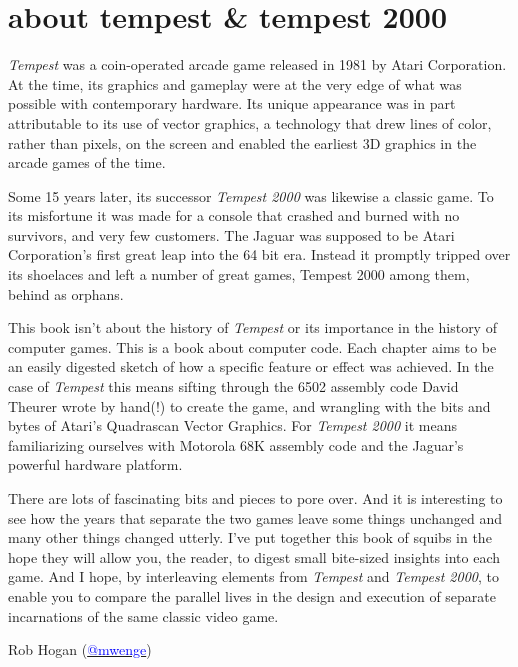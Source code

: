 \chapter*{about tempest \& tempest 2000} 
\textit{Tempest} was a coin-operated arcade game released in 1981 by Atari
Corporation. At the time, its graphics and gameplay were at the very edge of
what was possible with contemporary hardware.  Its unique appearance was in
part attributable to its use of vector graphics, a technology that
drew lines of color, rather than pixels, on the screen and enabled the earliest
3D graphics in the arcade games of the time.

Some 15 years later, its successor \textit{Tempest 2000} was likewise a classic
game. To its misfortune it was made for a console that crashed and burned with
no survivors, and very few customers. The Jaguar was supposed to be Atari Corporation's first great
leap into the 64 bit era. Instead it promptly tripped over its shoelaces and
left a number of great games, Tempest 2000 among them, behind as orphans.

This book isn't about the history of \textit{Tempest} or its importance in the history
of computer games.  This is a book about computer code. Each chapter aims to be
an easily digested sketch of how a specific feature or effect was achieved. In
the case of \textit{Tempest} this means sifting through the 6502 assembly code
David Theurer wrote by hand(!) to create the game, and wrangling with the bits
and bytes of Atari's Quadrascan Vector Graphics. For \textit{Tempest 2000} it
means familiarizing ourselves with Motorola 68K assembly code and the Jaguar's
powerful hardware platform.

There are lots of fascinating bits and pieces to pore over. And it is
interesting to see how the years that separate the two games leave some things
unchanged and many other things changed utterly. I've put together this book of
squibs in the hope they will allow you, the reader, to digest small bite-sized
insights into each game. And I hope, by interleaving elements from \textit{Tempest} and
\textit{Tempest 2000}, to enable you to compare the parallel lives in the design
and execution of separate incarnations of the same classic video game.

Rob Hogan (\href{https://mastodon.social/@mwenge}{\textcolor{blue}{@mwenge}})\\
\the\year{} \\

